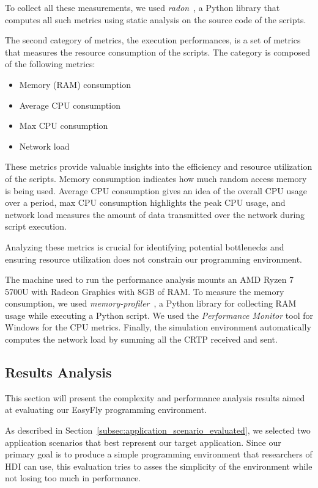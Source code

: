 To collect all these measurements, we used \textit{radon}~\cite{radon}, a Python library that computes all such metrics using static analysis on the source code of the scripts.

The second category of metrics, the execution performances, is a set of metrics that measures the resource consumption of the scripts.
The category is composed of the following metrics:
\begin{itemize}
    \item Memory (RAM) consumption
    \item Average CPU consumption 
    \item Max CPU consumption
    \item Network load
\end{itemize}

These metrics provide valuable insights into the efficiency and resource utilization of the scripts. 
Memory consumption indicates how much random access memory is being used. 
Average CPU consumption gives an idea of the overall CPU usage over a period, max CPU consumption highlights the peak CPU usage, and network load measures the amount of data transmitted over the network during script execution.

Analyzing these metrics is crucial for identifying potential bottlenecks and ensuring resource utilization does not constrain our programming environment.

The machine used to run the performance analysis mounts an AMD Ryzen 7 5700U with Radeon Graphics with 8GB of RAM.
To measure the memory consumption, we used \textit{memory-profiler}~\cite{memoryProfiler}, a Python library for collecting RAM usage while executing a Python script.
We used the \textit{Performance Monitor} tool for Windows for the CPU metrics. 
Finally, the simulation environment automatically computes the network load by summing all the CRTP received and sent.

\subsection{Results Analysis}\label{subsec:result_analysis}
This section will present the complexity and performance analysis results aimed at evaluating our EasyFly programming environment.

As described in Section~\ref{subsec:application_scenario_evaluated}, we selected two application scenarios that best represent our target application.
Since our primary goal is to produce a simple programming environment that researchers of HDI can use, this evaluation tries to asses the simplicity of the environment while not losing too much in performance. 

